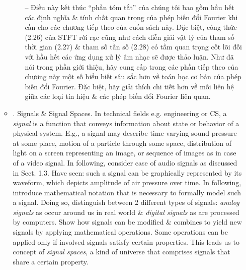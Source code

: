 \documentclass{article}
\begin{document}
\begin{itemize}
\begin{itemize}
\begin{itemize}
			-- Điều này kết thúc ``phần tóm tắt'' của chúng tôi bao gồm hầu hết các định nghĩa \& tính chất quan trọng của phép biến đổi Fourier khi cần cho các chương tiếp theo của cuốn sách này. Đặc biệt, công thức (2.26) của STFT rời rạc cũng như cách diễn giải vật lý của tham số thời gian (2.27) \& tham số tần số (2.28) có tầm quan trọng cốt lõi đối với hầu hết các ứng dụng xử lý âm nhạc sẽ được thảo luận. Như đã nói trong phần giới thiệu, hãy cung cấp trong các phần tiếp theo của chương này một số hiểu biết sâu sắc hơn về toán học cơ bản của phép biến đổi Fourier. Đặc biệt, hãy giải thích chi tiết hơn về mối liên hệ giữa các loại tín hiệu \& các phép biến đổi Fourier liên quan.
		\end{itemize}
		\item {. Signals \& Signal Spaces.} In technical fields e.g. engineering or CS, a {\it signal} is a function that conveys information about state or behavior of a physical system. E.g., a signal may describe time-varying sound pressure at some place, motion of a particle through some space, distribution of light on a screen representing an image, or sequence of images as in case of a video signal. In following, consider case of audio signals as discussed in Sect. 1.3. Have seen: such a signal can be graphically represented by its waveform, which depicts amplitude of air pressure over time. In following, introduce mathematical notation that is necessary to formally model such a signal. Doing so, distinguish between 2 different types of signals: {\it analog signals} as occur around us in real world \& {\it digital signals} as are processed by computers. Show how signals can be modified \& combines to yield new signals by applying mathematical operations. Some operations can be applied only if involved signals satisfy certain properties. This leads us to concept of {\it signal spaces}, a kind of universe that comprises signals that share a certain property.
		

\end{itemize}
\end{itemize}
\end{document}
